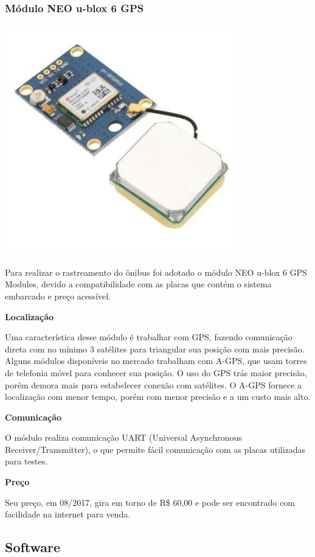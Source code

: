 \documentclass[
	12pt,				%
	oneside,			%
	a4paper,			%
	brazil				%
]{abntex2}
\begin{document}
\subsubsection{Módulo NEO u-blox 6 GPS}

\includegraphics[width=10cm, center]{images/neo-6m}

Para realizar o rastreamento do ônibus foi adotado o módulo NEO u-blox 6 GPS Modules, devido a compatibilidade com as placas que contém o sistema embarcado e preço acessível. 

\textbf{Localização}

Uma característica desse módulo é trabalhar com GPS, fazendo comunicação direta com no mínimo 3 satélites para triangular sua posição com mais precisão. Alguns módulos disponíveis no mercado trabalham com A-GPS, que usam torres de telefonia móvel para conhecer sua posição.
O uso do GPS trás maior precisão, porém demora mais para estabelecer conexão com satélites. O A-GPS fornece a localização com menor tempo, porém com menor precisão e a um custo mais alto.

\textbf{Comunicação}

O módulo realiza comunicação UART (Universal Asynchronous Receiver/Transmitter), o que permite fácil comunicação com as placas utilizadas para testes.

\textbf{Preço}

Seu preço, em 08/2017, gira em torno de R\$ 60,00 e pode ser encontrado com facilidade na internet para venda. 


\subsection{Software}
\end{document}
